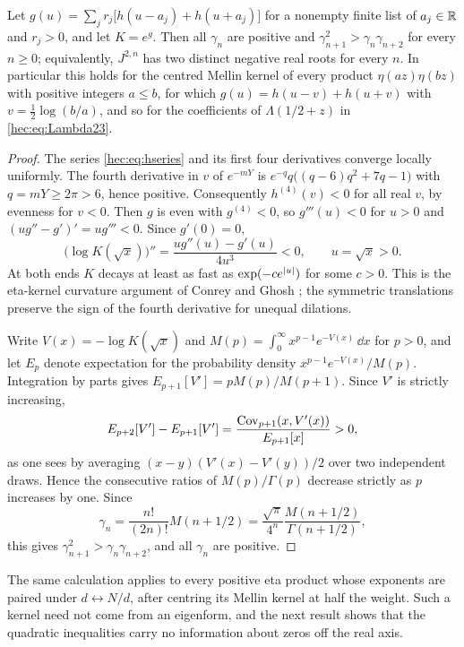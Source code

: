 \begin{theorem}\label{hec:thm:turan}
Let $g(u)=\sum_jr_j\bigl[h(u-a_j)+h(u+a_j)\bigr]$ for a nonempty finite list of $a_j\in\mathbb{R}$ and $r_j>0$, and
let $K=e^{g}$. Then all $\gamma_n$ are positive and $\gamma_{n+1}^2>\gamma_n\gamma_{n+2}$ for every
$n\ge0$; equivalently, $J^{2,n}$ has two distinct negative real roots for every $n$. In particular this
holds for the centred Mellin kernel of every product $\eta(az)\eta(bz)$ with positive integers $a\le b$,
for which $g(u)=h(u-v)+h(u+v)$ with $v=\tfrac12\log(b/a)$, and so for the coefficients of
$\Lambda(1/2+z)$ in \eqref{hec:eq:Lambda23}.
\end{theorem}

\begin{proof}
The series \eqref{hec:eq:hseries} and its first four derivatives converge locally uniformly. The fourth
derivative in $v$ of $e^{-mY}$ is $e^{-q}q\bigl((q-6)q^2+7q-1\bigr)$ with $q=mY\ge2\pi>6$, hence positive.
Consequently $h^{(4)}(v)<0$ for all real $v$, by evenness for $v<0$. Then $g$ is even with $g^{(4)}<0$, so
$g'''(u)<0$ for $u>0$ and $(ug''-g')'=ug'''<0$. Since $g'(0)=0$,
\[
 \bigl(\log K(\sqrt x)\bigr)''=\frac{ug''(u)-g'(u)}{4u^3}<0,\qquad u=\sqrt x>0 .
\]
At both ends $K$ decays at least as fast as $\exp(-ce^{\lvert u\rvert})$ for some $c>0$. This is the eta-kernel
curvature argument of Conrey and Ghosh \cite{ConreyGhosh1994Turan}; the symmetric translations preserve
the sign of the fourth derivative for unequal dilations.

Write $V(x)=-\log K(\sqrt x)$ and $M(p)=\int_0^\infty x^{p-1}e^{-V(x)}\,\dd x$ for $p>0$, and let $E_p$
denote expectation for the probability density $x^{p-1}e^{-V(x)}/M(p)$. Integration by parts gives
$E_{p+1}[V']=pM(p)/M(p+1)$. Since $V'$ is strictly increasing,
\[
 E_{p+2}[V']-E_{p+1}[V']=\frac{\operatorname{Cov}_{p+1}(x,V'(x))}{E_{p+1}[x]}>0,
\]
as one sees by averaging $(x-y)(V'(x)-V'(y))/2$ over two independent draws. Hence the consecutive ratios
of $M(p)/\Gamma(p)$ decrease strictly as $p$ increases by one. Since
\[
 \gamma_n=\frac{n!}{(2n)!}M(n+1/2)=\frac{\sqrt\pi}{4^n}\frac{M(n+1/2)}{\Gamma(n+1/2)},
\]
this gives $\gamma_{n+1}^2>\gamma_n\gamma_{n+2}$, and all $\gamma_n$ are positive.
\end{proof}

The same calculation applies to every positive eta product whose exponents are paired under
$d\leftrightarrow N/d$, after centring its Mellin kernel at half the weight. Such a kernel need not come
from an eigenform, and the next result shows that the quadratic inequalities carry no information about
zeros off the real axis.

